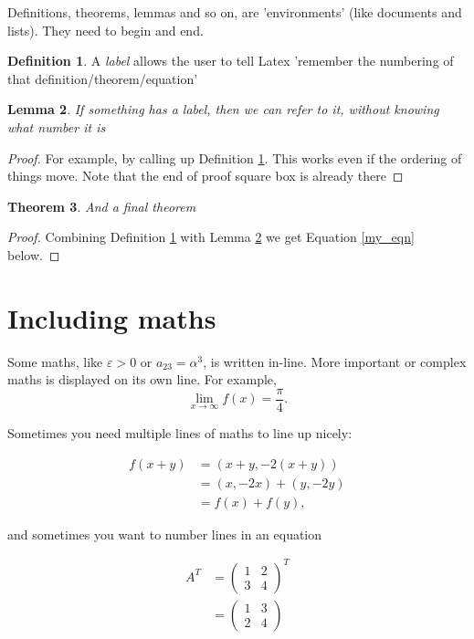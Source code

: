 \documentclass[a4paper,11pt]{article}
\newtheorem{theorem}{Theorem}[section]
\newtheorem{lemma}[theorem]{Lemma}
\theoremstyle{definition}
\newtheorem{definition}[theorem]{Definition}
\begin{document}
Definitions, theorems, lemmas and so on, are 'environments' (like documents and lists). They need to begin and end.

\begin{definition}\label{my_def}
	A \emph{label} allows the user to tell Latex 'remember the numbering of that definition/theorem/equation'
\end{definition}

\begin{lemma} \label{my_lem}
	If something has a label, then we can refer to it, without knowing what number it is 
\end{lemma}

\begin{proof}
	For example, by calling up Definition \ref{my_def}. This works even if the ordering of things move.
	Note that the end of proof square box is already there
\end{proof}

\begin{theorem}
	And a final theorem
\end{theorem}

\begin{proof}
	Combining Definition \ref{my_def} with Lemma \ref{my_lem} we get Equation \ref{my_eqn} below.
\end{proof}

\section{Including maths}

Some maths, like $\varepsilon>0$ or $a_{23}=\alpha^3$, is written in-line. More important or complex maths is displayed on its own line.
For example, $$ \lim_{x\to\infty}f(x)=\frac{\pi}{4}.$$

Sometimes you need multiple lines of maths to line up nicely:

\begin{align*}
f(x+y)&=(x+y,-2(x+y))\\
&=(x,-2x)+(y,-2y)\\
&=f(x)+f(y),
\end{align*}

and sometimes you want to number lines in an equation

\begin{align}
A^{T} & =\begin{pmatrix}1 & 2\\
3 & 4
\end{pmatrix}^{T}\\
\label{my_eqn}  & =\begin{pmatrix}1 & 3\\
2 & 4
\end{pmatrix}
\end{align}
\end{document}
